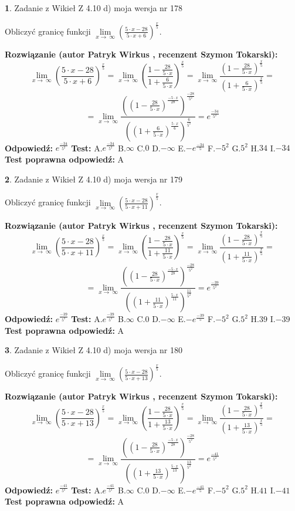 \documentclass[12pt, a4paper]{article}
\theoremstyle{definition} %
\newtheorem{zad}{}
\newcommand{\zadStart}[1]{\begin{zad}#1\newline}
\newcommand{\zadStop}{\end{zad}}
\newcommand{\rozwStart}[2]{\noindent \textbf{Rozwiązanie (autor #1 , recenzent #2): }\newline}
\newcommand{\rozwStop}{\newline}
\newcommand{\odpStart}{\noindent \textbf{Odpowiedź:}\newline}
\newcommand{\odpStop}{\newline}
\newcommand{\testStart}{\noindent \textbf{Test:}\newline}
\newcommand{\testStop}{\newline}
\newcommand{\kluczStart}{\noindent \textbf{Test poprawna odpowiedź:}\newline}
\newcommand{\kluczStop}{\newline}
\begin{document}
\zadStart{Zadanie z Wikieł Z 4.10 d) moja wersja nr 178}


Obliczyć granicę funkcji  $\lim\limits_{x\to\ \infty}(\frac{5\cdot x-28}{5\cdot x+6})^{\frac{x}{5}}$.
\zadStop
\rozwStart{Patryk Wirkus}{Szymon Tokarski}
$$\lim\limits_{x\to\ \infty}(\frac{5\cdot x-28}{5\cdot x+6})^{\frac{x}{5}} = \lim\limits_{x\to\ \infty}(\frac{1-\frac{28}{5\cdot x}}{1+\frac{6}{5\cdot x}})^{\frac{x}{5}}=\lim\limits_{x\to\ \infty}\frac{(1-\frac{28}{5\cdot x})^{\frac{x}{5}}}{(1+\frac{6}{5\cdot x})^{\frac{x}{5}}}=$$
$$=\lim\limits_{x\to\ \infty}\frac{((1-\frac{28}{5\cdot x})^{\frac{-5\cdot x}{28}})^{\frac{-28}{5^{2}}}}{((1+\frac{6}{5\cdot x})^{\frac{5\cdot x}{6}})^{\frac{6}{5^{2}}}}=e^{\frac{-34}{5^{2}}}$$
\rozwStop
\odpStart
$e^{\frac{-34}{5^{2}}}$
\odpStop
\testStart
A.$e^{\frac{-34}{5^{2}}}$ B.$\infty$ C.$0$ D.$-\infty$ E.$-e^{\frac{-34}{5}}$
F.$-5^{2}$ G.$5^{2}$
H.$34$
I.$-34$
\testStop
\kluczStart
A
\kluczStop



\zadStart{Zadanie z Wikieł Z 4.10 d) moja wersja nr 179}


Obliczyć granicę funkcji  $\lim\limits_{x\to\ \infty}(\frac{5\cdot x-28}{5\cdot x+11})^{\frac{x}{5}}$.
\zadStop
\rozwStart{Patryk Wirkus}{Szymon Tokarski}
$$\lim\limits_{x\to\ \infty}(\frac{5\cdot x-28}{5\cdot x+11})^{\frac{x}{5}} = \lim\limits_{x\to\ \infty}(\frac{1-\frac{28}{5\cdot x}}{1+\frac{11}{5\cdot x}})^{\frac{x}{5}}=\lim\limits_{x\to\ \infty}\frac{(1-\frac{28}{5\cdot x})^{\frac{x}{5}}}{(1+\frac{11}{5\cdot x})^{\frac{x}{5}}}=$$
$$=\lim\limits_{x\to\ \infty}\frac{((1-\frac{28}{5\cdot x})^{\frac{-5\cdot x}{28}})^{\frac{-28}{5^{2}}}}{((1+\frac{11}{5\cdot x})^{\frac{5\cdot x}{11}})^{\frac{11}{5^{2}}}}=e^{\frac{-39}{5^{2}}}$$
\rozwStop
\odpStart
$e^{\frac{-39}{5^{2}}}$
\odpStop
\testStart
A.$e^{\frac{-39}{5^{2}}}$ B.$\infty$ C.$0$ D.$-\infty$ E.$-e^{\frac{-39}{5}}$
F.$-5^{2}$ G.$5^{2}$
H.$39$
I.$-39$
\testStop
\kluczStart
A
\kluczStop



\zadStart{Zadanie z Wikieł Z 4.10 d) moja wersja nr 180}


Obliczyć granicę funkcji  $\lim\limits_{x\to\ \infty}(\frac{5\cdot x-28}{5\cdot x+13})^{\frac{x}{5}}$.
\zadStop
\rozwStart{Patryk Wirkus}{Szymon Tokarski}
$$\lim\limits_{x\to\ \infty}(\frac{5\cdot x-28}{5\cdot x+13})^{\frac{x}{5}} = \lim\limits_{x\to\ \infty}(\frac{1-\frac{28}{5\cdot x}}{1+\frac{13}{5\cdot x}})^{\frac{x}{5}}=\lim\limits_{x\to\ \infty}\frac{(1-\frac{28}{5\cdot x})^{\frac{x}{5}}}{(1+\frac{13}{5\cdot x})^{\frac{x}{5}}}=$$
$$=\lim\limits_{x\to\ \infty}\frac{((1-\frac{28}{5\cdot x})^{\frac{-5\cdot x}{28}})^{\frac{-28}{5^{2}}}}{((1+\frac{13}{5\cdot x})^{\frac{5\cdot x}{13}})^{\frac{13}{5^{2}}}}=e^{\frac{-41}{5^{2}}}$$
\rozwStop
\odpStart
$e^{\frac{-41}{5^{2}}}$
\odpStop
\testStart
A.$e^{\frac{-41}{5^{2}}}$ B.$\infty$ C.$0$ D.$-\infty$ E.$-e^{\frac{-41}{5}}$
F.$-5^{2}$ G.$5^{2}$
H.$41$
I.$-41$
\testStop
\kluczStart
A
\kluczStop
\end{document}
